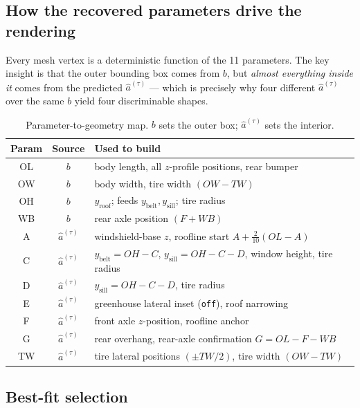 \documentclass[11pt]{article}
\newcommand{\OL}{\mathit{OL}}
\newcommand{\OW}{\mathit{OW}}
\newcommand{\OH}{\mathit{OH}}
\newcommand{\WB}{\mathit{WB}}
\newcommand{\TW}{\mathit{TW}}
\theoremstyle{definition}
\begin{document}
\subsection{How the recovered parameters drive the rendering}

Every mesh vertex is a deterministic function of the 11 parameters. The key insight is that the outer bounding box comes from $b$, but \emph{almost everything inside it} comes from the predicted $\hat{a}^{(\tau)}$ --- which is precisely why four different $\hat{a}^{(\tau)}$ over the same $b$ yield four discriminable shapes.

\begin{table}[h]
\centering
\renewcommand{\arraystretch}{1.15}
\begin{tabular}{>{\ttfamily}c c p{8.5cm}}
\toprule
\textbf{Param} & \textbf{Source} & \textbf{Used to build} \\
\midrule
OL & $b$ & body length, all $z$-profile positions, rear bumper \\
OW & $b$ & body width, tire width $(\OW-\TW)$ \\
OH & $b$ & $y_{\text{roof}}$; feeds $y_{\text{belt}}, y_{\text{sill}}$; tire radius \\
WB & $b$ & rear axle position $(F+\WB)$ \\
A  & $\hat{a}^{(\tau)}$ & windshield-base $z$, roofline start $A+\tfrac{2}{10}(\OL-A)$ \\
C  & $\hat{a}^{(\tau)}$ & $y_{\text{belt}}=\OH-C$, $y_{\text{sill}}=\OH-C-D$, window height, tire radius \\
D  & $\hat{a}^{(\tau)}$ & $y_{\text{sill}}=\OH-C-D$, tire radius \\
E  & $\hat{a}^{(\tau)}$ & greenhouse lateral inset (\texttt{off}), roof narrowing \\
F  & $\hat{a}^{(\tau)}$ & front axle $z$-position, roofline anchor \\
G  & $\hat{a}^{(\tau)}$ & rear overhang, rear-axle confirmation $G=\OL-F-\WB$ \\
TW & $\hat{a}^{(\tau)}$ & tire lateral positions $(\pm \TW/2)$, tire width $(\OW-\TW)$ \\
\bottomrule
\end{tabular}
\caption{Parameter-to-geometry map. $b$ sets the outer box; $\hat{a}^{(\tau)}$ sets the interior.}
\end{table}

\subsection{Best-fit selection}
\end{document}
